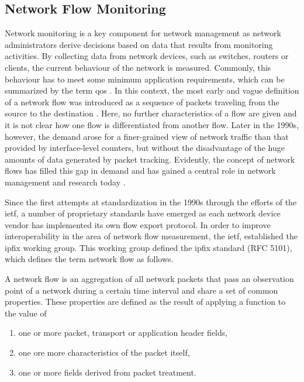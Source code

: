 \subsection{Network Flow Monitoring}\label{subsec:network_flow_monitoring}

Network monitoring is a key component for network management as network administrators derive decisions based on data that results from monitoring activities. By collecting data from network devices, such as switches, routers or clients, the current behaviour of the network is measured. Commonly, this behaviour has to meet some minimum application requirements, which can be summarized by the term \gls{qos} \cite[406]{tanenbaum2021computer}. In this context, the most early and vague definition of a network flow was introduced as a sequence of packets traveling from the source to the destination \cite{clark1988design}. Here, no further characteristics of a flow are given and it is not clear how one flow is differentiated from another flow. Later in the 1990s, however, the demand arose for a finer-grained view of network traffic than that provided by interface-level counters, but without the disadvantage of the huge amounts of data generated by packet tracking. Evidently, the concept of network flows has filled this gap in demand and has gained a central role in network management and research today \cite{trammell2011introduction}.

Since the first attempts at standardization in the 1990s through the efforts of the \gls{ietf}, a number of proprietary standards have emerged as each network device vendor has implemented its own flow export protocol. In order to improve interoperability in the area of network flow measurement, the \gls{ietf}, established the \gls{ipfix} working group. This working group defined the \gls{ipfix} standard (RFC 5101), which defines the term network flow as follows.

\begin{definition}
A network flow is an aggregation of all network packets that pass an observation point of a network during a certain time interval and share a set of common properties. These properties are defined as the result of applying a function to the value of
\begin{enumerate}
    \item one or more packet, transport or application header fields,
    \item one ore more characteristics of the packet itself,
    \item one or more fields derived from packet treatment.
\end{enumerate}

\end{definition}

